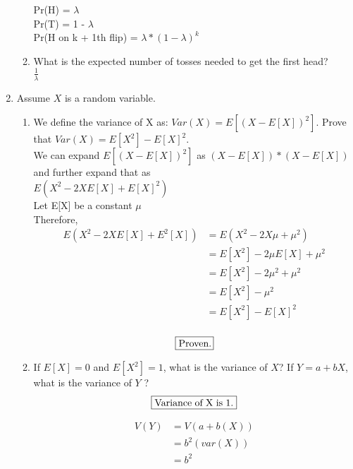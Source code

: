 \documentclass{article}
\begin{document}
\begin{enumerate}
\begin{enumerate}
Pr(H) = $\lambda$\\
Pr(T) = 1 - $\lambda$\\
Pr(H on k + 1th flip) = $\lambda*(1-\lambda)^{k}$

\item What is the expected number of tosses needed to get the first head?\\
\LARGE
$\frac{1}{\lambda}$
\normalsize

\end{enumerate}


\item Assume $X$ is a random variable.  
\begin{enumerate}
\item We define the variance of X as: $Var(X) = E[(X - E[X])^2]$. Prove that $Var(X) = E[X^2] - E[X]^2$.\\

We can expand $E[(X - E[X])^2]$ as $(X - E[X])*(X - E[X])$ and further expand that as\\ $E(X^2 - 2XE[X] + E[X]^2)$\\
Let E[X] be a constant $\mu$ \\
Therefore, \\
\begin{equation*}
 \begin{split}
E(X^2 - 2XE[X] + E^2[X]) 
 &= E(X^2 - 2X \mu + \mu ^2) \\
 &= E[X^2] - 2 \mu E[X] + \mu ^2 \\
 &= E[X^2] - 2 \mu ^2 + \mu ^2 \\
 &= E[X^2] - \mu ^2 \\
 &= E[X^2] - E[X]^2 \\
 \end{split}
\end{equation*}

$$\fbox{\begin{minipage}{3.2em}
Proven.
\end{minipage}}$$

\item If $E[X] = 0$ and $E[X^2] = 1$, what is the variance of $X$? If $Y = a + bX$, what is the variance of $Y$ ?\\

$$\fbox{\begin{minipage}{8em}
Variance of X is 1.
\end{minipage}}$$

\begin{equation*}
\begin{split}
V(Y) 
&= V(a +b(X))\\
&= b^2(var(X))\\
&= b^2
\end{split}
\end{equation*}


\end{enumerate}
\end{enumerate}
\end{document}
